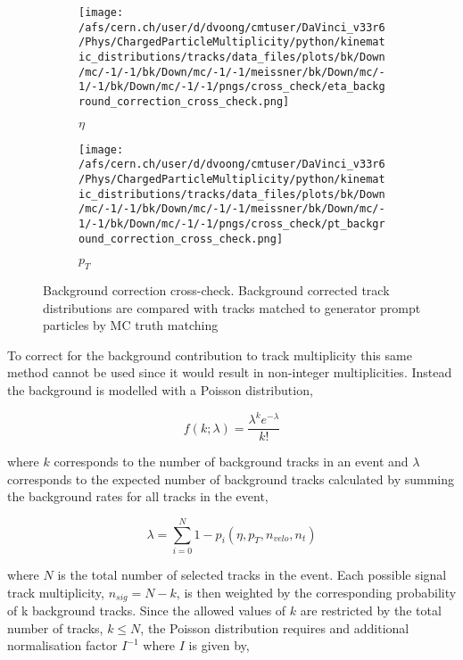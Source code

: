 \begin{figure}[h]
	\begin{subfigure}{0.49\textwidth}
		\texttt{[image: /afs/cern.ch/user/d/dvoong/cmtuser/DaVinci\_v33r6/Phys/ChargedParticleMultiplicity/python/kinematic\_distributions/tracks/data\_files/plots/bk/Down/mc/-1/-1/bk/Down/mc/-1/-1/meissner/bk/Down/mc/-1/-1/bk/Down/mc/-1/-1/pngs/cross\_check/eta\_background\_correction\_cross\_check.png]}
		\caption{$\eta$}
	\end{subfigure}
	\begin{subfigure}{0.49\textwidth}
		\texttt{[image: /afs/cern.ch/user/d/dvoong/cmtuser/DaVinci\_v33r6/Phys/ChargedParticleMultiplicity/python/kinematic\_distributions/tracks/data\_files/plots/bk/Down/mc/-1/-1/bk/Down/mc/-1/-1/meissner/bk/Down/mc/-1/-1/bk/Down/mc/-1/-1/pngs/cross\_check/pt\_background\_correction\_cross\_check.png]}
		\caption{$p_T$}
	\end{subfigure}
	\caption{Background correction cross-check. Background corrected track distributions are compared with tracks matched to generator prompt particles by MC truth matching}
	\label{fig: background correction cross-check}
\end{figure}

To correct for the background contribution to track multiplicity this same method cannot be used since it would result in non-integer multiplicities. Instead the background is modelled with a Poisson distribution,

\begin{equation*}
	f(k; \lambda) = \frac{\lambda^{k}e^{-\lambda}}{k!}
\end{equation*}

where $k$ corresponds to the number of background tracks in an event and $\lambda$ corresponds to the expected number of background tracks calculated by summing the background rates for all tracks in the event,

\begin{equation}
	\lambda = \sum^{N}_{i=0} 1 - p_i(\eta, p_T, n_{velo}, n_t)
\end{equation}

where $N$ is the total number of selected tracks in the event. Each possible signal track multiplicity, $n_{sig} = N - k$, is then weighted by the corresponding probability of k background tracks. Since the allowed values of $k$ are restricted by the total number of tracks, $k \le N$, the Poisson distribution requires and additional normalisation factor $I^{-1}$ where $I$ is given by, 

